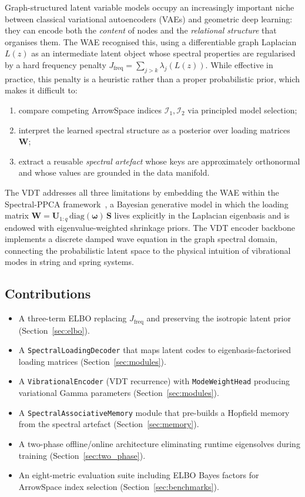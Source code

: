 \documentclass[11pt,a4paper]{article}
\newcommand{\I}{\mathcal{I}}
\newcommand{\diag}{\mathrm{diag}}
\newcommand{\bU}{\bm{U}}
\newcommand{\bS}{\bm{S}}
\newcommand{\bW}{\bm{W}}
\newcommand{\bomega}{\bm{\omega}}
\begin{document}
Graph-structured latent variable models occupy an increasingly important niche
between classical variational autoencoders (VAEs) and geometric deep learning:
they can encode both the \emph{content} of nodes and the \emph{relational
structure} that organises them.  The WAE
recognised this, using a differentiable graph Laplacian $L(z)$ as an
intermediate latent object whose spectral properties are regularised by a hard
frequency penalty $J_{\mathrm{freq}} = \sum_{j>k}\lambda_j(L(z))$.  While
effective in practice, this penalty is a heuristic rather than a proper
probabilistic prior, which makes it difficult to:
\begin{enumerate}
  \item compare competing ArrowSpace indices $\I_1, \I_2$ via principled model
        selection;
  \item interpret the learned spectral structure as a posterior over loading
        matrices $\bW$;
  \item extract a reusable \emph{spectral artefact} whose keys are
        approximately orthonormal and whose values are grounded in the data
        manifold.
\end{enumerate}

The VDT addresses all three limitations by embedding the WAE
within the Spectral-PPCA framework~\citep{design_a}, a Bayesian
generative model in which the loading matrix
$\bW = \bU_{1:q}\,\diag(\bomega)\,\bS$ lives explicitly in the Laplacian
eigenbasis and is endowed with eigenvalue-weighted shrinkage priors.  The VDT
encoder backbone implements a discrete damped wave equation in the graph
spectral domain, connecting the probabilistic latent space to the physical
intuition of vibrational modes in string and spring systems.

\subsection{Contributions}
\begin{itemize}
  \item A three-term ELBO replacing $J_{\mathrm{freq}}$ and preserving the
        isotropic latent prior (Section~\ref{sec:elbo}).
  \item A \texttt{SpectralLoadingDecoder} that maps latent codes to
        eigenbasis-factorised loading matrices
        (Section~\ref{sec:modules}).
  \item A \texttt{VibrationalEncoder} (VDT recurrence) with
        \texttt{ModeWeightHead} producing variational Gamma parameters
        (Section~\ref{sec:modules}).
  \item A \texttt{SpectralAssociativeMemory} module that pre-builds a
        Hopfield memory from the spectral artefact
        (Section~\ref{sec:memory}).
  \item A two-phase offline/online architecture eliminating runtime
        eigensolves during training (Section~\ref{sec:two_phase}).
  \item An eight-metric evaluation suite including ELBO Bayes factors for
        ArrowSpace index selection (Section~\ref{sec:benchmarks}).
\end{itemize}
\end{document}
